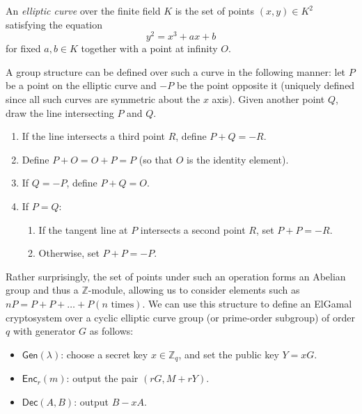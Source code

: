 \documentclass[12pt,a4paper]{article}
\theoremstyle{definition}
\begin{document}
\begin{definition}
    An \textit{elliptic curve} over the finite field $K$ is the set of points $(x, y)\in K^2$ satisfying the equation
    $$y^2 = x^3 + ax + b$$
    for fixed $a, b\in K$ together with a point at infinity $O$.
\end{definition}

A group structure can be defined over such a curve in the following manner: let $P$ be a point on the elliptic curve and $-P$ be the point opposite it (uniquely defined since all such curves are symmetric about the $x$ axis). Given another point $Q$, draw the line intersecting $P$ and $Q$.
\begin{enumerate}
    \item If the line intersects a third point $R$, define $P + Q = -R$.
    \item Define $P + O = O + P = P$ (so that $O$ is the identity element).
    \item If $Q = -P$, define $P + Q = O$.
    \item If $P = Q$:
    \begin{enumerate}
        \item If the tangent line at $P$ intersects a second point $R$, set $P + P = -R$.
        \item Otherwise, set $P + P = -P$.
    \end{enumerate}
\end{enumerate}
Rather surprisingly, the set of points under such an operation forms an Abelian group and thus a $\mathbb{Z}$-module, allowing us to consider elements such as $nP = P + P + \ldots + P (n \text{ times})$. We can use this structure to define an ElGamal cryptosystem over a cyclic elliptic curve group (or prime-order subgroup) of order $q$ with generator $G$ as follows:
\begin{itemize}
    \item $\mathsf{Gen}(\lambda)$: choose a secret key $x\in\mathbb{Z}_q$, and set the public key $Y = xG$.
    \item $\mathsf{Enc}_r(m)$: output the pair $(rG, M + rY)$.
    \item $\mathsf{Dec}(A, B)$: output $B - xA$.
\end{itemize}
\newpage
\end{document}
